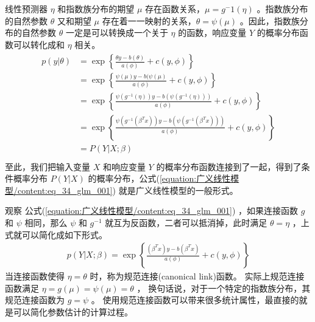\documentclass[letterpaper,10pt,english]{sphinxmanual}
\begin{document}
线性预测器 \(\eta\) 和指数族分布的期望 \(\mu\) 存在函数关系，\(\mu=g^-1(\eta)\)
。指数族分布的自然参数 \(\theta\)
又和期望 \(\mu\) 存在着一一映射的关系，\(\theta=\psi(\mu)\)
。因此，指数族分布的自然参数 \(\theta\) 一定是可以转换成一个关于 \(\eta\)
的函数，响应变量 \(Y\) 的概率分布函数可以转化成和 \(\eta\) 相关。
\begin{align}\label{equation:广义线性模型/content:eq_34_glm_001}\!\begin{aligned}
p(y|\theta) &= \exp \left \{\frac{\theta y - b(\theta)}{a(\phi)} + c(y,\phi) \right \}\\
&= \exp \left \{ \frac{\psi(\mu) y - b(\psi(\mu)}{a(\phi)} + c(y,\phi)  \right \}\\
&= \exp \left \{ \frac{ \psi(g^{-1}(\eta)) y - b(   \psi(g^{-1}(\eta)) )}{a(\phi)} + c(y,\phi)  \right \}\\
&= \exp \left \{ \frac{ \psi(g^{-1}(\beta^T x)) y - b(   \psi(g^{-1}(\beta^T x)) )}{a(\phi)} + c(y,\phi)  \right \}\\
&= P(Y|X;\beta)\\
\end{aligned}\end{align}
至此，我们把输入变量 \(X\) 和响应变量 \(Y\) 的概率分布函数连接到了一起，得到了条件概率分布 \(P(Y|X)\)
的概率分布，公式(\ref{equation:广义线性模型/content:eq_34_glm_001}) 就是广义线性模型的一般形式。


观察 公式(\ref{equation:广义线性模型/content:eq_34_glm_001}) ，如果连接函数 \(g\) 和 \(\psi\) 相同，那么 \(\psi\)
和 \(g^{-1}\) 就互为反函数，二者可以抵消掉，此时满足 \(\theta=\eta\)
，上式就可以简化成如下形式。
\begin{equation}\label{equation:广义线性模型/content:eq_34_glm_002}
\begin{split}p(Y|X;\beta) = \exp \left \{ \frac{ (\beta^Tx )y - b(\beta^Tx  )}{a(\phi)} + c(y,\phi)  \right \}\end{split}
\end{equation}
当连接函数使得 \(\eta=\theta\) 时，称为规范连接(canonical link)函数。
实际上规范连接函数满足 \(\eta=g(\mu)=\psi(\mu)=\theta\) ，
换句话说，对于一个特定的指数族分布，其规范连接函数为 \(g=\psi\) 。
使用规范连接函数可以带来很多统计属性，最直接的就是可以简化参数估计的计算过程。

\end{document}
